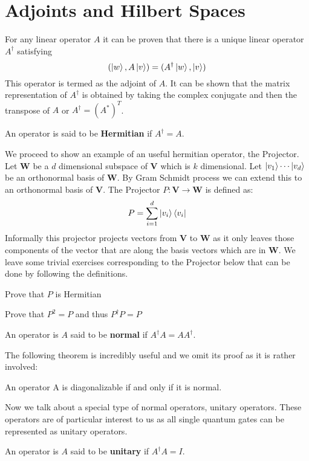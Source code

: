 \section{Adjoints and Hilbert Spaces}

For any linear operator $A$ it can be proven that there is a unique linear operator $A^{\dagger}$ satisfying 
$$ (\ket{w}, A\ket{v}) = (A^{\dagger}\ket{w}, \ket{v})$$
This operator is termed as the adjoint of $A$.
It can be shown that the matrix representation of $A^\dagger$ is obtained by taking the complex conjugate and then the transpose of $A$ or $A^\dagger = (A^*)^T$.

\begin{definition}
An operator is said to be \textbf{Hermitian} if $A^\dagger = A$.
\end{definition}
We proceed to show an example of an useful hermitian operator, the Projector.
Let $\textbf{W}$ be a $d$ dimensional subspace of $\textbf{V}$ which is $k$ dimensional. Let $\ket{v_1} \cdots \ket{v_d}$ be an orthonormal basis of $\textbf{W}$. By Gram Schmidt process we can extend this to an orthonormal basis of $\textbf{V}$.
The Projector $P: \textbf{V} \rightarrow \textbf{W}$ is defined as:
$$P = \sum_{i=1}^{d} \ket{v_i}\bra{v_i}$$
Informally this projector projects vectors from $\textbf{V}$ to $\textbf{W}$ as it only leaves those components of the vector that are along the basis vectors which are in $\textbf{W}$. We leave some trivial exercises corresponding to the Projector below that can be done by following the definitions.

\begin{exercise}
Prove that $P$ is Hermitian
\end{exercise}
\begin{exercise}
Prove that $P^2 = P$ and thus $P^\dagger P = P$
\end{exercise}
\begin{definition}
An operator is $A$ said to be \textbf{normal} if $A^\dagger A  = AA^\dagger$.
\end{definition}
The following theorem is incredibly useful and we omit its proof as it is rather involved:
\begin{theorem} An operator A is diagonalizable if and only if it is normal.
\end{theorem}

Now we talk about a special type of normal operators, unitary operators. These operators are of particular interest to us as all single quantum gates can be represented as unitary operators. 
\begin{definition}
An operator is $A$ said to be \textbf{unitary} if $A^\dagger A  = I$.
\end{definition}


